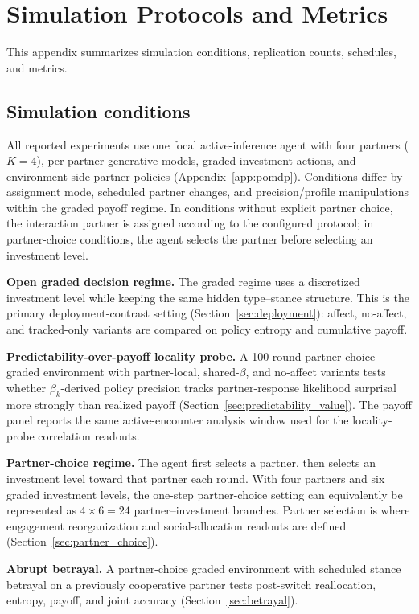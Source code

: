 \section{Simulation Protocols and Metrics}
\label{app:protocols}

This appendix summarizes simulation conditions, replication counts, schedules, and metrics.

\subsection{Simulation conditions}

All reported experiments use one focal active-inference agent with four partners (\(K=4\)), per-partner generative models, graded investment actions, and environment-side partner policies (Appendix~\ref{app:pomdp}). Conditions differ by assignment mode, scheduled partner changes, and precision/profile manipulations within the graded payoff regime. In conditions without explicit partner choice, the interaction partner is assigned according to the configured protocol; in partner-choice conditions, the agent selects the partner before selecting an investment level.

\textbf{Open graded decision regime.} The graded regime uses a discretized investment level while keeping the same hidden type--stance structure. This is the primary deployment-contrast setting (Section~\ref{sec:deployment}): affect, no-affect, and tracked-only variants are compared on policy entropy and cumulative payoff.

\textbf{Predictability-over-payoff locality probe.} A 100-round partner-choice graded environment with partner-local, shared-$\beta$, and no-affect variants tests whether $\beta_k$-derived policy precision tracks partner-response likelihood surprisal more strongly than realized payoff (Section~\ref{sec:predictability_value}). The payoff panel reports the same active-encounter analysis window used for the locality-probe correlation readouts.

\textbf{Partner-choice regime.} The agent first selects a partner, then selects an investment level toward that partner each round. With four partners and six graded investment levels, the one-step partner-choice setting can equivalently be represented as \(4 \times 6 = 24\) partner--investment branches. Partner selection is where engagement reorganization and social-allocation readouts are defined (Section~\ref{sec:partner_choice}).

\textbf{Abrupt betrayal.} A partner-choice graded environment with scheduled stance betrayal on a previously cooperative partner tests post-switch reallocation, entropy, payoff, and joint accuracy (Section~\ref{sec:betrayal}).

